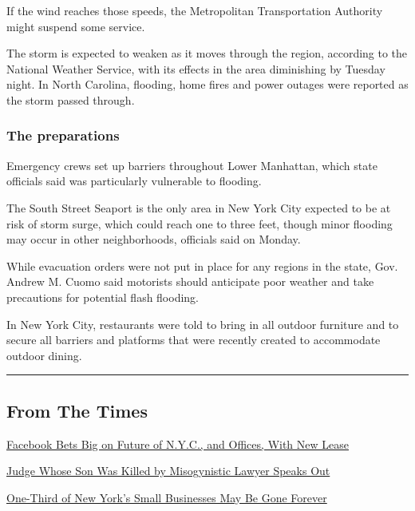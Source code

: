 If the wind reaches those speeds, the Metropolitan Transportation
Authority might suspend some service.

The storm is expected to weaken as it moves through the region,
according to the National Weather Service, with its effects in the area
diminishing by Tuesday night. In North Carolina, flooding, home fires
and power outages were reported as the storm passed through.

\hypertarget{the-preparations}{%
\subsubsection{The preparations}\label{the-preparations}}

Emergency crews set up barriers throughout Lower Manhattan, which state
officials said was particularly vulnerable to flooding.

The South Street Seaport is the only area in New York City expected to
be at risk of storm surge, which could reach one to three feet, though
minor flooding may occur in other neighborhoods, officials said on
Monday.

While evacuation orders were not put in place for any regions in the
state, Gov. Andrew M. Cuomo said motorists should anticipate poor
weather and take precautions for potential flash flooding.

In New York City, restaurants were told to bring in all outdoor
furniture and to secure all barriers and platforms that were recently
created to accommodate outdoor dining.

\begin{center}\rule{0.5\linewidth}{\linethickness}\end{center}

\hypertarget{from-the-times}{%
\subsection{From The Times}\label{from-the-times}}

\href{https://www.nytimes.com/2020/08/03/nyregion/facebook-nyc-office-farley-building.html}{Facebook
Bets Big on Future of N.Y.C., and Offices, With New Lease}

\href{https://www.nytimes.com/2020/08/03/nyregion/esther-salas-roy-den-hollander.html}{Judge
Whose Son Was Killed by Misogynistic Lawyer Speaks Out}

\href{https://www.nytimes.com/2020/08/03/nyregion/nyc-small-businesses-closing-coronavirus.html}{One-Third
of New York's Small Businesses May Be Gone Forever}


